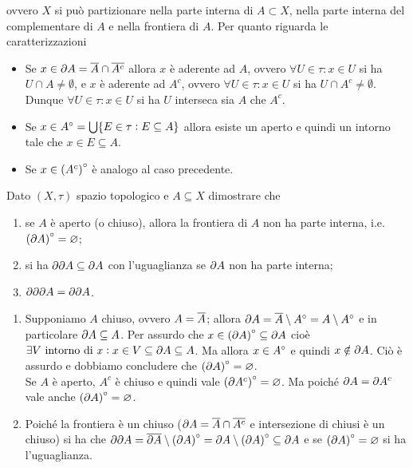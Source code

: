 \documentclass[a4paper]{article}\par \usepackage{style}\par
\begin{document}
ovvero $ X $ si può partizionare nella parte interna di $ A \subset X $, nella parte interna del complementare di $ A $ e nella frontiera di $ A $. Per quanto riguarda le caratterizzazioni
\begin{itemize}
\item Se $ x \in \partial{A} = \overline{A} \cap \overline{A^c} $ allora $ x $ è aderente ad $ A $, ovvero $ \forall U \in \tau : x \in U $ si ha $ U \cap A \neq \emptyset $, e $ x $ è aderente ad $ A^c $, ovvero $ \forall U \in \tau : x \in U $ si ha $ U \cap A^c \neq \emptyset $. Dunque $ \forall U \in \tau : x \in U $ si ha $ U $ interseca sia $ A $ che $ A^c $.
\item Se $ x \in {A}^{\circ} = \bigcup \{E \in \tau : E \subseteq A\} $ allora esiste un aperto e quindi un intorno tale che $ x \in E \subseteq A $.
\item Se $ x \in {(A^c)}^{\circ} $ è analogo al caso precedente.
\end{itemize}\par \begin{es}
  Dato $ (X, \tau) $ spazio topologico e $ A \subseteq X $ dimostrare che
  \begin{enumerate}[label = (\roman*)]
  \item se $ A $ è aperto (o chiuso), allora la frontiera di $ A $ non ha parte interna, i.e. $ {(\partial{A})}^{\circ} = \varnothing $;
  \item si ha $ \partial{\partial{A}} \subseteq \partial{A} $ con l'uguaglianza se $ \partial{A} $ non ha parte interna;
  \item $ \partial{\partial{\partial{A}}} = \partial{\partial{A}} $.
  \end{enumerate}
\end{es}\par \begin{enumerate}[label = (\roman*)]
\item Supponiamo $ A $ chiuso, ovvero $ A = \overline{A} $; allora $ \partial{A} = \overline{A} \setminus {A}^{\circ} = A \setminus {A}^{\circ} $ e in particolare $ \partial{A} \subseteq A $. Per assurdo che $ x \in {(\partial{A})}^{\circ} \subseteq \partial{A} $ cioè $ \exists V \text{ intorno di } x : x \in V \subseteq \partial{A} \subseteq A $. Ma allora $ x \in {A}^{\circ} $ e quindi $ x \notin \partial{A} $. Ciò è assurdo e dobbiamo concludere che $ {(\partial{A})}^{\circ} = \varnothing $. \\
  Se $ A $ è aperto, $ A^c $ è chiuso e quindi vale $ {(\partial{A^c})}^{\circ} = \varnothing $. Ma poiché $ \partial{A} = \partial{A^c} $ vale anche $ {(\partial{A})}^{\circ} = \varnothing $.
\item Poiché la frontiera è un chiuso ($ \partial{A} = \overline{A} \cap \overline{A^c} $ e intersezione di chiusi è un chiuso) si ha che $ \partial{\partial{A}} = \overline{\partial{A}} \setminus {(\partial{A})}^{\circ} = \partial{A} \setminus {(\partial{A})}^{\circ} \subseteq \partial{A} $ e se $ {(\partial{A})}^{\circ} = \varnothing $ si ha l'uguaglianza.

\end{enumerate}
\end{document}
